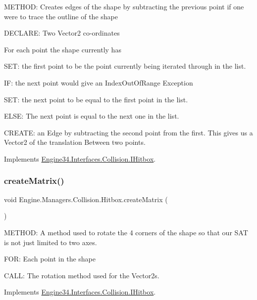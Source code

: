M\+E\+T\+H\+OD\+: Creates edges of the shape by subtracting the previous point if one were to trace the outline of the shape 

D\+E\+C\+L\+A\+RE\+: Two Vector2 co-\/ordinates

For each point the shape currently has

S\+ET\+: the first point to be the point currently being iterated through in the list.

IF\+: the next point would give an Index\+Out\+Of\+Range Exception

S\+ET\+: the next point to be equal to the first point in the list.

E\+L\+SE\+: The next point is equal to the next one in the list.

C\+R\+E\+A\+TE\+: an Edge by subtracting the second point from the first. This gives us a Vector2 of the translation Between two points. 

Implements \hyperlink{a00434_a94297321cbc20a7cb6a98cf38b735a5b}{Engine34.\+Interfaces.\+Collision.\+I\+Hitbox}.

\mbox{\label{a00506_ab91473c67469cf0be5069c1ca9a2d6fb}} 
\subsubsection{\texorpdfstring{create\+Matrix()}{createMatrix()}}
{\footnotesize\ttfamily void Engine.\+Managers.\+Collision.\+Hitbox.\+create\+Matrix (\begin{DoxyParamCaption}{ }\end{DoxyParamCaption})\hspace{0.3cm}{\ttfamily [inline]}}



M\+E\+T\+H\+OD\+: A method used to rotate the 4 corners of the shape so that our S\+AT is not just limited to two axes. 

F\+OR\+: Each point in the shape

C\+A\+LL\+: The rotation method used for the Vector2s. 

Implements \hyperlink{a00434_acd7cc791467a53026ad0657a13265f1e}{Engine34.\+Interfaces.\+Collision.\+I\+Hitbox}.

\mbox{\label{a00506_ae78ae27deafc11bf87c1396c504ce621}} 
